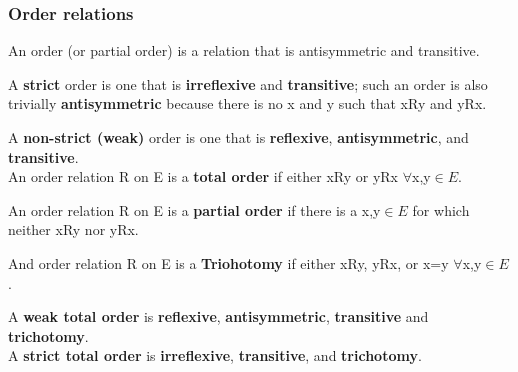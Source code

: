 \subsubsection{Order relations}
An order (or partial order) is a relation that is antisymmetric and transitive. 

A  \textbf{strict} order is one that is \textbf{irreflexive} and  \textbf{transitive}; such an order is also trivially  \textbf{antisymmetric} because there is no x and y such that xRy and yRx. 

A \textbf{non-strict (weak)} order is one that is \textbf{reflexive}, \textbf{antisymmetric}, and \textbf{transitive}. \\

An order relation R on E is a \textbf{total order} if either xRy or yRx $\forall$x,y$\in{E}$. 

An order relation R on E is a \textbf{partial order} if there is a  x,y$\in{E}$ for which neither xRy nor yRx. 

And order relation R on E is a \textbf{Triohotomy} if either xRy, yRx, or x=y $\forall$x,y$\in{E}$.

A \textbf{weak total order} is \textbf{reflexive}, \textbf{antisymmetric}, \textbf{transitive} and \textbf{trichotomy}. \\
A \textbf{strict total order} is \textbf{irreflexive}, \textbf{transitive}, and \textbf{trichotomy}.

